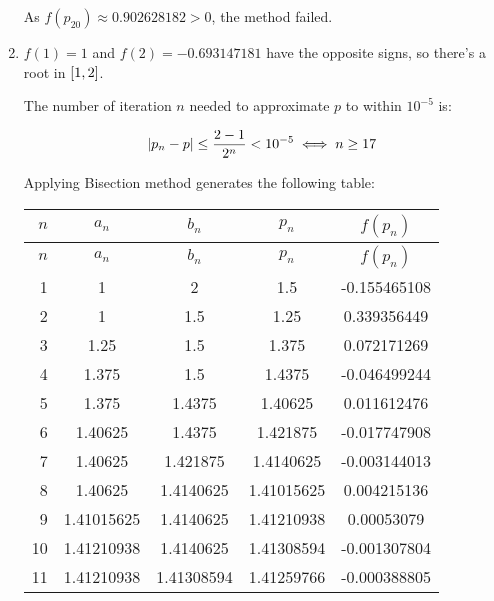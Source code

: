 \documentclass[../../../../Assignments.tex]{subfiles}
\begin{document}
\begin{solution}
\begin{enumerate}[label = (\alph*)]
            As \(f(p_20) \approx \num{0.902628182} > 0\), the method failed.

        \item \(f(1) = 1\) and \(f(2) = \num{-0.693147181}\) have the opposite
            signs, so there's a root in \(\interval{1}{2}\).

            The number of iteration \(n\) needed to approximate \(p\) to within
            \(10^{-5}\) is:

            \[\abs{p_n - p} \leq \frac{2 - 1}{2^n} < 10^{-5} \iff n \geq 17\]

            Applying Bisection method generates the following table:

            \begin{longtable}{r S[table-format=1.8] S[table-format=1.8] S[table-format=1.8] S[table-format=-1.9]}
                \toprule
                \(n\)  &   {\(a_n\)}   &   {\(b_n\)}   &   {\(p_n\)}   &  {\(f(p_n)\)}  \\
                \midrule
                \endfirsthead
                \(n\)  &   {\(a_n\)}   &   {\(b_n\)}   &   {\(p_n\)}   &  {\(f(p_n)\)}  \\
                \midrule
                  &  1            &  2            &  1.5          &  -0.155465108  \\
                    2  &  1            &  1.5          &  1.25         &   0.339356449  \\
                    3  &  1.25         &  1.5          &  1.375        &   0.072171269  \\
                    4  &  1.375        &  1.5          &  1.4375       &  -0.046499244  \\
                    5  &  1.375        &  1.4375       &  1.40625      &   0.011612476  \\
                    6  &  1.40625      &  1.4375       &  1.421875     &  -0.017747908  \\
                    7  &  1.40625      &  1.421875     &  1.4140625    &  -0.003144013  \\
                    8  &  1.40625      &  1.4140625    &  1.41015625   &   0.004215136  \\
                    9  &  1.41015625   &  1.4140625    &  1.41210938   &   0.00053079   \\
                   10  &  1.41210938   &  1.4140625    &  1.41308594   &  -0.001307804  \\
                   11  &  1.41210938   &  1.41308594   &  1.41259766   &  -0.000388805  \\

\end{longtable}
\end{enumerate}
\end{solution}
\end{document}
